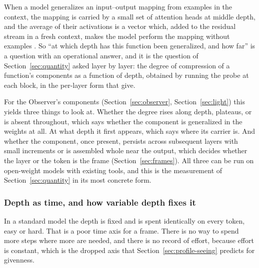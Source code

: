 When a model generalizes an input--output mapping from examples in the context, the mapping is carried by
a small set of attention heads at middle depth, and the average of their activations is a vector which,
added to the residual stream in a fresh context, makes the model perform the mapping without examples
\citep{todd2024}. So ``at which depth has this function been generalized, and how far'' is a question
with an operational answer, and it is the question of Section~\ref{sec:quantity} asked layer by layer:
the degree of compression of a function's components as a function of depth, obtained by running the
probe at each block, in the per-layer form that \citet{voita2020} give.

For the Observer's components (Section~\ref{sec:observer}, Section~\ref{sec:light}) this yields three
things to look at. Whether the degree rises along depth, plateaus, or is absent throughout, which says
whether the component is generalized in the weights at all. At what depth it first appears, which says
where its carrier is. And whether the component, once present, persists across subsequent layers with
small increments or is assembled whole near the output, which decides whether the layer or the token is
the frame (Section~\ref{sec:frames}). All three can be run on open-weight models with existing tools, and
this is the measurement of Section~\ref{sec:quantity} in its most concrete form.

\subsubsection{Depth as time, and how variable depth fixes it}
\label{sec:depthtime}

In a standard model the depth is fixed and is spent identically on every token, easy or hard. That is a
poor time axis for a frame. There is no way to spend more steps where more are needed, and there is no
record of effort, because effort is constant, which is the dropped axis that Section~\ref{sec:profile-seeing} predicts for
givenness.

